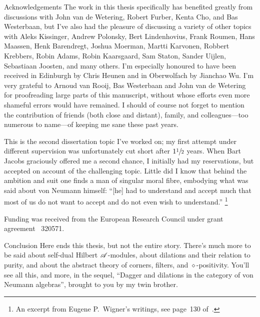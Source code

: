 \documentclass[b5paper]{book}
\begin{document}
\begin{parsec}
\begin{point}{Acknowledgements}
The work in this thesis specifically
has benefited greatly from
discussions
with John van de Wetering,
Robert Furber,
Kenta Cho,
and Bas Westerbaan,
but I've also had the pleasure
of discussing a variety
of other topics 
with 
Aleks Kissinger,
Andrew Polonsky,
Bert Lindenhovius,
Frank Roumen, 
Hans Maassen,
Henk Barendregt,
Joshua Moerman,
Martti Karvonen,
Robbert Krebbers,
Robin Adams, 
Robin Kaarsgaard,
Sam Staton, 
Sander Uijlen,
Sebastiaan Joosten,
and many others.
I'm especially honoured to have been received
in Edinburgh by Chris Heunen 
and in Oberwolfach
by Jianchao Wu.
I'm very grateful to
Arnoud van Rooij,
Bas Westerbaan
and
John van de Wetering
for proofreading large parts of
this manuscript,
without whose efforts
even more shameful errors would have remained.
I should of course not forget to mention
the contribution
of friends (both close and distant),
family,
and colleagues---too numerous to name---of keeping me sane
these past years.

This is the second dissertation topic
I've worked on;
my first attempt
under different supervision
was unfortunately cut short after $1\sfrac{1}{2}$ years.
When Bart Jacobs graciously offered
me a second chance,
I initially had my reservations,
but accepted on account of the challenging topic.
Little did I know 
that behind the ambition and suit
	one finds a man
of singular moral fibre,
embodying
what was said
	about von Neumann himself:
	``[he] had to understand and accept much that most 
of us do not want to accept and do not even wish to understand.''%
\footnote{An excerpt from Eugene P.~Wigner's writings,
see page~130 of~\cite{wigner2013collected}.}
\end{point}
\begin{point}{Funding} was received from the 
European Research Council under grant agreement \textnumero~320571.
\end{point}
\end{parsec}

%



\begin{parsec}
\begin{point}[conclusion]{Conclusion}
Here ends this thesis,
but not the entire story.
There's much more to be said
about self-dual Hilbert $\mathscr{A}$-modules,
about dilations and their relation to purity,
and about the abstract theory of corners, filters,
and $\diamond$-positivity.
You'll see all this,
and more,
in the sequel,
``Dagger and dilations in the category of von Neumann algebras''\cite{bas},
brought to you by my twin brother.
\end{point}
\end{parsec}
\end{document}
